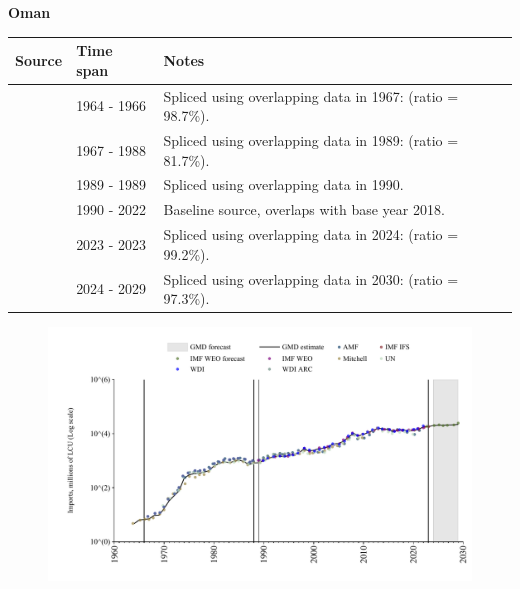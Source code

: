 \documentclass[12pt,a4paper,landscape]{article}
\begin{document}
\begin{adjustbox}{max totalsize={\paperwidth}{\paperheight},center}
\begin{minipage}[t][\textheight][t]{\textwidth}
\vspace*{0.5cm}
{}
\begin{center}
{\Large\bfseries Oman}
\end{center}
\vspace{0.5cm}
\begin{table}[H]
\centering
\small
\begin{tabular}{|l|l|l|}
\hline
\textbf{Source} & \textbf{Time span} & \textbf{Notes} \\
\hline
\rowcolor{white}\cite{Mitchell}& 1964 - 1966 &Spliced using overlapping data in 1967: (ratio = 98.7\%).\\
\rowcolor{lightgray}\cite{WDI}& 1967 - 1988 &Spliced using overlapping data in 1989: (ratio = 81.7\%).\\
\rowcolor{white}\cite{UN}& 1989 - 1989 &Spliced using overlapping data in 1990.\\
\rowcolor{lightgray}\cite{WDI}& 1990 - 2022 &Baseline source, overlaps with base year 2018.\\
\rowcolor{white}\cite{IMF_IFS}& 2023 - 2023 &Spliced using overlapping data in 2024: (ratio = 99.2\%).\\
\rowcolor{lightgray}\cite{IMF_WEO_forecast}& 2024 - 2029 &Spliced using overlapping data in 2030: (ratio = 97.3\%).\\
\hline
\end{tabular}
\end{table}
\begin{figure}[H]
\centering
\includegraphics[width=\textwidth,height=0.6\textheight,keepaspectratio]{graphs/OMN_imports.pdf}
\end{figure}
\end{minipage}
\end{adjustbox}
\end{document}
